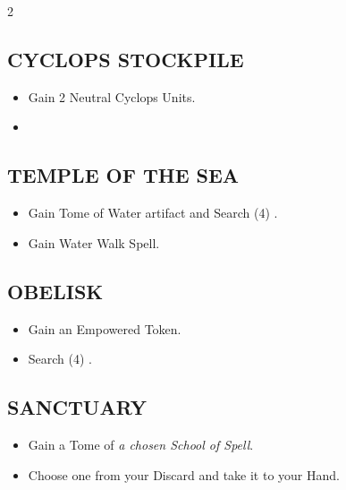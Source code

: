 \begin{multicols*}{2}
\subsection*{\MakeUppercase{Cyclops Stockpile}}
\begin{itemize}
  \item Gain 2 Neutral Cyclops Units.
  \item
\end{itemize}

\subsection*{\MakeUppercase{Temple of the Sea}}
\begin{itemize}
  \item Gain Tome of Water artifact and Search (4) .
  \item Gain Water Walk Spell.
\end{itemize}

\subsection*{\MakeUppercase{Obelisk}}
\begin{itemize}
  \item Gain an Empowered Token.
  \item Search (4) .
\end{itemize}

\subsection*{\MakeUppercase{Sanctuary}}
\begin{itemize}
  \item Gain a Tome of \textit{a chosen School of Spell}.
  \item Choose one  from your Discard and take it to your Hand.
\end{itemize}

\end{multicols*}
